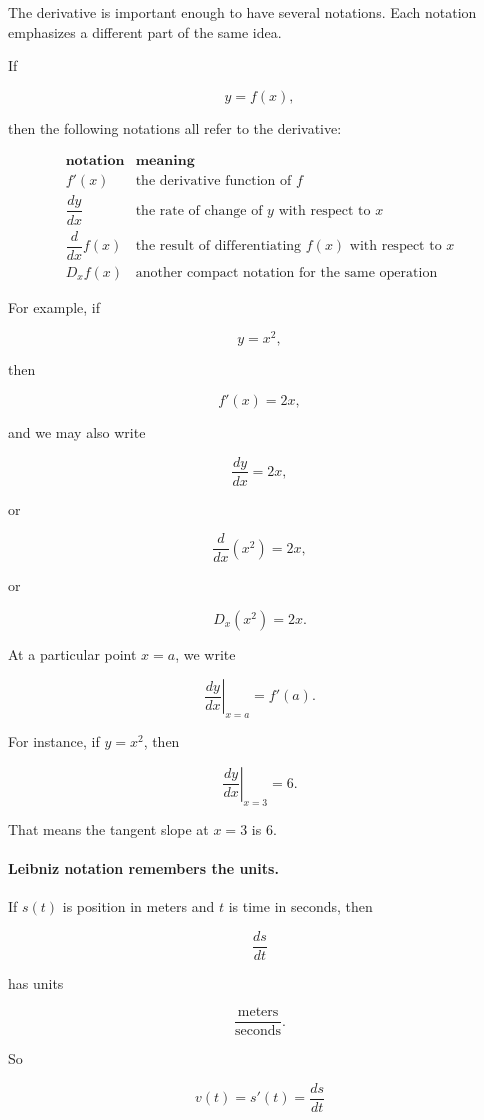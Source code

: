 The derivative is important enough to have several notations.  Each notation emphasizes a different part of the same idea.

If

\[
y=f(x),
\]

then the following notations all refer to the derivative:

\[
\begin{array}{c|l}
\textbf{notation} & \textbf{meaning} \\ \hline
f'(x) & \text{the derivative function of }f \\[3pt]
\dfrac{dy}{dx} & \text{the rate of change of }y\text{ with respect to }x \\[8pt]
\dfrac{d}{dx}f(x) & \text{the result of differentiating }f(x)\text{ with respect to }x \\[8pt]
D_x f(x) & \text{another compact notation for the same operation}
\end{array}
\]

For example, if

\[
y=x^2,
\]

then

\[
f'(x)=2x,
\]

and we may also write

\[
\frac{dy}{dx}=2x,
\]

or

\[
\frac{d}{dx}(x^2)=2x,
\]

or

\[
D_x(x^2)=2x.
\]

At a particular point \(x=a\), we write

\[
\left.\frac{dy}{dx}\right|_{x=a}=f'(a).
\]

For instance, if \(y=x^2\), then

\[
\left.\frac{dy}{dx}\right|_{x=3}=6.
\]

That means the tangent slope at \(x=3\) is \(6\).

\paragraph{Leibniz notation remembers the units.}
If \(s(t)\) is position in meters and \(t\) is time in seconds, then

\[
\frac{ds}{dt}
\]

has units

\[
\frac{\text{meters}}{\text{seconds}}.
\]

So

\[
v(t)=s'(t)=\frac{ds}{dt}
\]


